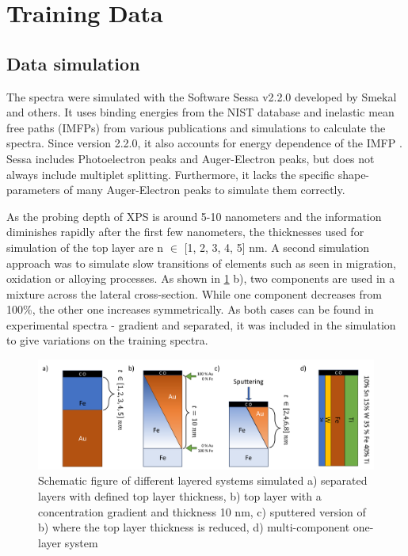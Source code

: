 

\section{Training Data}
\label{train_data}


\subsection{Data simulation}

The spectra were simulated with the Software Sessa v2.2.0 developed by Smekal and others. It uses binding energies from the NIST database and inelastic mean free paths (IMFPs) from various publications and simulations to calculate the spectra. Since version 2.2.0, it also accounts for energy dependence of the IMFP \cite{noauthor_nist_2010}.
Sessa includes Photoelectron peaks and Auger-Electron peaks, but does not always include multiplet splitting. Furthermore, it lacks the specific shape-parameters of many Auger-Electron peaks to simulate them correctly.

As the probing depth of XPS is around 5-10 nanometers and the information diminishes rapidly after the first few nanometers, the thicknesses used for simulation of the top layer are n $\in$ [1, 2, 3, 4, 5] nm. A second simulation approach was to simulate slow transitions of elements such as seen in migration, oxidation or alloying processes. As shown in \ref{fig:layers} b), two components are used in a mixture across the lateral cross-section. While one component decreases from 100\%, the other one increases symmetrically. As both cases can be found in experimental spectra - gradient and separated, it was included in the simulation to give variations on the training spectra.

\begin{figure}
    \centering
    \includegraphics[width=\textwidth]{Figures/layers.png}
    \caption{Schematic figure of different layered systems simulated a) separated layers with defined top layer thickness, b) top layer with a concentration gradient and thickness 10 nm, c) sputtered version of b) where the top layer thickness is reduced, d) multi-component one-layer system}
    \label{fig:layers}
\end{figure}


